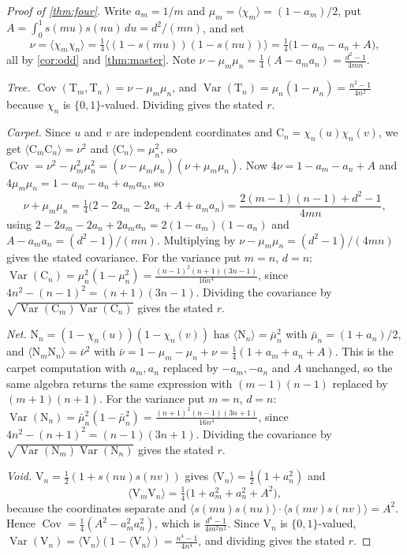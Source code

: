 \documentclass[11pt]{amsart}
\theoremstyle{definition}
\theoremstyle{remark}
\begin{document}
\begin{proof}[Proof of \cref{thm:four}]
Write $a_m=1/m$ and $\mu_m=\langle\chi_m\rangle=(1-a_m)/2$, put $A=\int_0^1 s(mu)s(nu)\,du=d^2/(mn)$, and set
\[
\nu=\langle\chi_m\chi_n\rangle=\tfrac14\bigl\langle(1-s(mu))(1-s(nu))\bigr\rangle=\tfrac14\bigl(1-a_m-a_n+A\bigr),
\]
all by \cref{cor:odd} and \cref{thm:master}. Note $\nu-\mu_m\mu_n=\tfrac14(A-a_ma_n)=\frac{d^2-1}{4mn}$.

\emph{Tree.} $\operatorname{Cov}(\mathrm{T}_m,\mathrm{T}_n)=\nu-\mu_m\mu_n$, and $\operatorname{Var}(\mathrm{T}_n)=\mu_n(1-\mu_n)=\frac{n^2-1}{4n^2}$ because $\chi_n$ is $\{0,1\}$-valued. Dividing gives the stated $r$.

\emph{Carpet.} Since $u$ and $v$ are independent coordinates and $\mathrm{C}_n=\chi_n(u)\chi_n(v)$, we get $\langle \mathrm{C}_m\mathrm{C}_n\rangle=\nu^2$ and $\langle \mathrm{C}_n\rangle=\mu_n^2$, so $\operatorname{Cov}=\nu^2-\mu_m^2\mu_n^2=(\nu-\mu_m\mu_n)(\nu+\mu_m\mu_n)$. Now $4\nu=1-a_m-a_n+A$ and $4\mu_m\mu_n=1-a_m-a_n+a_ma_n$, so
\[
\nu+\mu_m\mu_n=\tfrac14\bigl(2-2a_m-2a_n+A+a_ma_n\bigr)=\frac{2(m-1)(n-1)+d^2-1}{4mn},
\]
using $2-2a_m-2a_n+2a_ma_n=2(1-a_m)(1-a_n)$ and $A-a_ma_n=(d^2-1)/(mn)$. Multiplying by $\nu-\mu_m\mu_n=(d^2-1)/(4mn)$ gives the stated covariance. For the variance put $m=n$, $d=n$: $\operatorname{Var}(\mathrm{C}_n)=\mu_n^2(1-\mu_n^2)=\frac{(n-1)^2(n+1)(3n-1)}{16n^4}$, since $4n^2-(n-1)^2=(n+1)(3n-1)$. Dividing the covariance by $\sqrt{\operatorname{Var}(\mathrm{C}_m)\operatorname{Var}(\mathrm{C}_n)}$ gives the stated $r$.

\emph{Net.} $\mathrm{N}_n=(1-\chi_n(u))(1-\chi_n(v))$ has $\langle\mathrm{N}_n\rangle=\bar\mu_n^2$ with $\bar\mu_n=(1+a_n)/2$, and $\langle\mathrm{N}_m\mathrm{N}_n\rangle=\bar\nu^2$ with $\bar\nu=1-\mu_m-\mu_n+\nu=\tfrac14(1+a_m+a_n+A)$. This is the carpet computation with $a_m,a_n$ replaced by $-a_m,-a_n$ and $A$ unchanged, so the same algebra returns the same expression with $(m-1)(n-1)$ replaced by $(m+1)(n+1)$. For the variance put $m=n$, $d=n$: $\operatorname{Var}(\mathrm{N}_n)=\bar\mu_n^2(1-\bar\mu_n^2)=\frac{(n+1)^2(n-1)(3n+1)}{16n^4}$, since $4n^2-(n+1)^2=(n-1)(3n+1)$. Dividing the covariance by $\sqrt{\operatorname{Var}(\mathrm{N}_m)\operatorname{Var}(\mathrm{N}_n)}$ gives the stated $r$.

\emph{Void.} $\mathrm{V}_n=\tfrac12(1+s(nu)s(nv))$ gives $\langle \mathrm{V}_n\rangle=\tfrac12(1+a_n^2)$ and
\[
\langle \mathrm{V}_m\mathrm{V}_n\rangle=\tfrac14\bigl(1+a_m^2+a_n^2+A^2\bigr),
\]
because the coordinates separate and $\langle s(mu)s(nu)\rangle\cdot\langle s(mv)s(nv)\rangle=A^2$. Hence $\operatorname{Cov}=\tfrac14(A^2-a_m^2a_n^2)$, which is $\frac{d^4-1}{4m^2n^2}$. Since $\mathrm{V}_n$ is $\{0,1\}$-valued, $\operatorname{Var}(\mathrm{V}_n)=\langle \mathrm{V}_n\rangle(1-\langle \mathrm{V}_n\rangle)=\frac{n^4-1}{4n^4}$, and dividing gives the stated $r$.
\end{proof}
\end{document}
